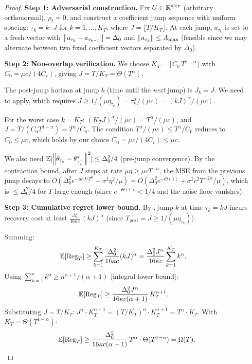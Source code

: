 \begin{proof}
\textbf{Step 1: Adversarial construction.}
Fix $U \in \mathbb{R}^{d\times r}$ (arbitrary orthonormal), $\rho_t = 0$,
and construct a coefficient jump sequence with uniform spacing:
$\tau_k = k \cdot J$ for $k = 1, \ldots, K_T$, where
$J = \lfloor T/K_T \rfloor$.
At each jump, $a_{\tau_k}$ is set to a fresh vector with
$\left\|a_{\tau_k} - a_{\tau_{k-1}}\right\| = \Delta_0$ and
$\left\|a_{\tau_k}\right\| \leq A_{\max}$ (feasible since we may alternate
between two fixed coefficient vectors separated by $\Delta_0$).

\medskip
\textbf{Step 2: Non-overlap verification.}
We choose $K_T = \lfloor C_0\, T^{1-\alpha}\rfloor$ with
$C_0 = \mu c/(4C_r)$, giving $J = T/K_T = \Theta(T^\alpha)$.

The post-jump horizon at jump $k$ (time until the \emph{next} jump)
is $J_k = J$. We need  to apply,
which requires $J \geq 1/(\mu\eta_{\tau_k})
= \tau_k^\alpha/(\mu c) = (kJ)^\alpha/(\mu c)$.

For the worst case $k = K_T$: $(K_T J)^\alpha/(\mu c)
= T^\alpha/(\mu c)$, and $J = T/(C_0 T^{1-\alpha}) = T^\alpha/C_0$.
The condition $T^\alpha/(\mu c) \leq T^\alpha/C_0$ reduces to
$C_0 \leq \mu c$, which holds by our choice $C_0 = \mu c/(4C_r) \leq \mu c$.

We also need $\mathbb{E}[\left\|\theta_{\tau_k} - \theta^*_{\tau_k^-}\right\|^2]
\leq \Delta_0^2/4$ (pre-jump convergence). By the contraction bound,
after $J$ steps at rate $\mu\eta \geq \mu c T^{-\alpha}$,
the MSE from the previous jump decays to
$O(\Delta_0^2 e^{-\mu c J/T^\alpha} + \sigma^2\eta^2/\mu)
= O(\Delta_0^2 e^{-\Theta(1)} + \sigma^2 c^2 T^{-2\alpha}/\mu)$,
which is $\leq \Delta_0^2/4$ for $T$ large enough
(since $e^{-\Theta(1)} < 1/4$ and the noise floor vanishes).

\medskip
\textbf{Step 3: Cumulative regret lower bound.}
By , jump $k$ at time $\tau_k = kJ$
incurs recovery cost at least
$\frac{\Delta_0^2}{16\kappa c}\,(kJ)^\alpha$ (since
$T_{\mathrm{post}} = J \geq 1/(\mu\eta_{\tau_k})$).

Summing:
\begin{align*}
  \mathbb{E}[\mathrm{Reg}_T]
  &\geq \sum_{k=1}^{K_T} \frac{\Delta_0^2}{16\kappa c}(kJ)^\alpha
  = \frac{\Delta_0^2 J^\alpha}{16\kappa c}
    \sum_{k=1}^{K_T} k^\alpha.
\end{align*}
Using $\sum_{k=1}^{n} k^\alpha \geq n^{\alpha+1}/(\alpha+1)$
(integral lower bound):
\begin{align*}
  \mathbb{E}[\mathrm{Reg}_T]
  &\geq \frac{\Delta_0^2 J^\alpha}{16\kappa c(\alpha+1)}\,
    K_T^{\alpha+1}.
\end{align*}
Substituting $J = T/K_T$:
$J^\alpha \cdot K_T^{\alpha+1}
= (T/K_T)^\alpha \cdot K_T^{\alpha+1}
= T^\alpha \cdot K_T$.
With $K_T = \Theta(T^{1-\alpha})$:
\[
  \mathbb{E}[\mathrm{Reg}_T] \geq
  \frac{\Delta_0^2}{16\kappa c(\alpha+1)}\,
  T^\alpha \cdot \Theta(T^{1-\alpha})
  = \Omega(T). \qedhere
\]
\end{proof}

